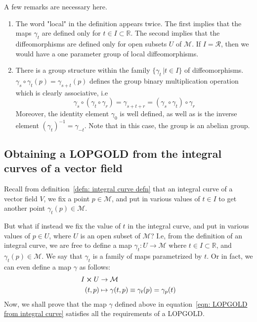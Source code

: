     \begin{remark}
      A few remarks are necessary here. 
      \begin{enumerate}
        \item{The word "local" in the definition appears twice. The first
          implies that the maps $\gamma_t$ are defined only for $t \in I
          \subset \mathbb{R}$. The second implies that the diffeomorphisms are
          defined only for open subsets $U$ of $\mathcal{M}$. If $I =
          \mathcal{R}$, then we would have a one parameter group of local
          diffeomorphisms.}
        \item{There is a group structure within the family $\{\gamma_t \,
          |t\in I\}$ of diffeomorphisms. $\gamma_s \circ \gamma_t(p) =
          \gamma_{s+t}(p)$ defines the group binary multiplication operation
          which is clearly associative, i.e
            \[\gamma_s \circ (\gamma_t \circ \gamma_r) = \gamma_{s+t+r} =
            (\gamma_s \circ \gamma_t) \circ \gamma_r \]
          Moreover, the identity element $\gamma_0$ is well defined, as
          well as is the inverse element $(\gamma_t)^{-1} = \gamma_{-t}$.
          Note that in this case, the group is an abelian group.}
      \end{enumerate}
    \end{remark}
    \subsection{Obtaining a LOPGOLD from the integral curves of a vector field}
      Recall from definition~\ref{defn: integral curve defn} that an integral
      curve of a vector field $V$, we fix a point $p \in \mathcal{M}$, and
      put in various values of $t \in I$ to get another point $\gamma_t(p)
      \in \mathcal{M}$.

      But what if instead we fix the value of $t$ in the integral curve, and
      put in various values of $p \in U$, where $U$ is an open subset of
      $\mathcal{M}$? I.e, from the definition of an integral curve, we are
      free to define a map $\gamma_t: U \rightarrow \mathcal{M}$
      where $t \in I \subset \mathbb{R}$, and $\gamma_t(p) \in
      \mathcal{M}$. We say that $\gamma_t$ is a family of maps parametrized
      by $t$. Or in fact, we can even define a map $\gamma$ as follows:
      \begin{equation}
        \label{eqn: LOPGOLD from integral curve}
        \begin{split}
          I \cross U &\rightarrow \mathcal{M} \\
          (t,p) &\mapsto \gamma(t,p) \equiv \gamma_t(p) = \gamma_p(t)
        \end{split}
      \end{equation}
      Now, we shall prove that the map $\gamma$ defined above in
      equation~\ref{eqn: LOPGOLD from integral curve} satisfies all the
      requirements of a LOPGOLD.

